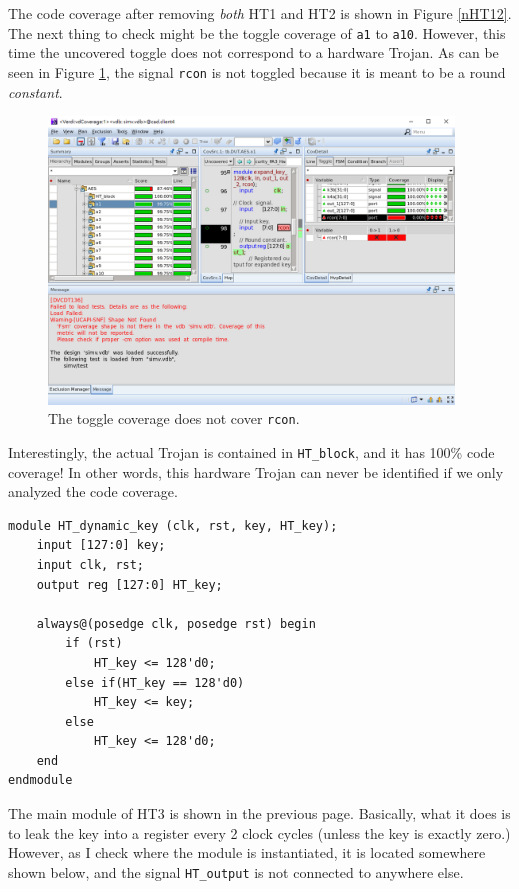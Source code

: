 \documentclass{article}
\begin{document}
The code coverage after removing \textit{both} HT1 and HT2 is shown in Figure \ref{nHT12}. The next thing to check might be the toggle coverage of \verb|a1| to \verb|a10|. However, this time the uncovered toggle does not correspond to a hardware Trojan. As can be seen in Figure \ref{rcon_toggle}, the signal \verb|rcon| is not toggled because it is meant to be a round \textit{constant}.

\begin{figure}[htp] \centering
\includegraphics[width=0.96\textwidth]{rcon_toggle}
\caption{The toggle coverage does not cover \texttt{rcon}.}
\label{rcon_toggle}
\end{figure}

Interestingly, the actual Trojan is contained in \verb|HT_block|, and it has 100\% code coverage! In other words, this hardware Trojan can never be identified if we only analyzed the code coverage.

\begin{verbatim}
module HT_dynamic_key (clk, rst, key, HT_key);
    input [127:0] key;
    input clk, rst;
    output reg [127:0] HT_key;

    always@(posedge clk, posedge rst) begin
        if (rst)
            HT_key <= 128'd0;
        else if(HT_key == 128'd0)
            HT_key <= key;
        else
            HT_key <= 128'd0;
    end
endmodule
\end{verbatim}

The main module of HT3 is shown in the previous page. Basically, what it does is to leak the key into a register every 2 clock cycles (unless the key is exactly zero.) However, as I check where the module is instantiated, it is located somewhere shown below, and the signal \verb|HT_output| is not connected to anywhere else.
\end{document}
